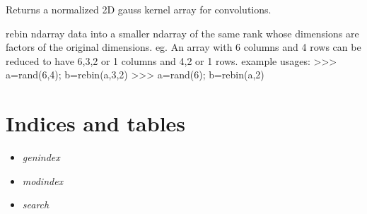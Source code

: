 \documentclass[a4paper,11pt,english]{sphinxmanual}
\begin{document}
\begin{fulllineitems}
\label{support:support.imageManipulation.gaussianKernel}
Returns a normalized 2D gauss kernel array for convolutions.

\end{fulllineitems}


\begin{fulllineitems}
\label{support:support.imageManipulation.rebin}
rebin ndarray data into a smaller ndarray of the same rank whose dimensions
are factors of the original dimensions. eg. An array with 6 columns and 4 rows
can be reduced to have 6,3,2 or 1 columns and 4,2 or 1 rows.
example usages:
\textgreater{}\textgreater{}\textgreater{} a=rand(6,4); b=rebin(a,3,2)
\textgreater{}\textgreater{}\textgreater{} a=rand(6); b=rebin(a,2)

\end{fulllineitems}


\begin{fulllineitems}
\label{support:support.imageManipulation.rebinFactor}
\end{fulllineitems}



\chapter{Indices and tables}
\label{index:indices-and-tables}\begin{itemize}
\item {} 
\emph{genindex}

\item {} 
\emph{modindex}

\item {} 
\emph{search}

\end{itemize}
\end{document}
